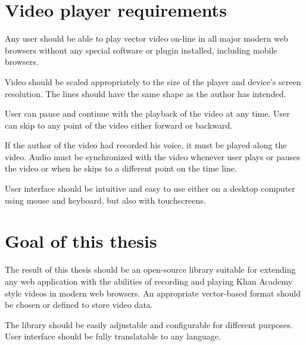 \section{Video player requirements}
Any user should be able to play vector video on-line in all major modern web browsers without any special software or plugin installed, including mobile browsers.

Video should be scaled appropriately to the size of the player and device's screen resolution. The lines should have the same shape as the author has intended.

User can pause and continue with the playback of the video at any time. User can skip to any point of the video either forward or backward.

If the author of the video had recorded his voice, it must be played along the video. Audio must be synchronized with the video whenever user plays or pauses the video or when he skips to a different point on the time line.

User interface should be intuitive and easy to use either on a desktop computer using mouse and keyboard, but also with touchscreens.

\section{Goal of this thesis}

The result of this thesis should be an open-source library suitable for extending any web application with the abilities of recording and playing Khan Academy style videos in modern web browsers. An appropriate vector-based format should be chosen or defined to store video data.

The library should be easily adjustable and configurable for different purposes. User interface should be fully translatable to any language.